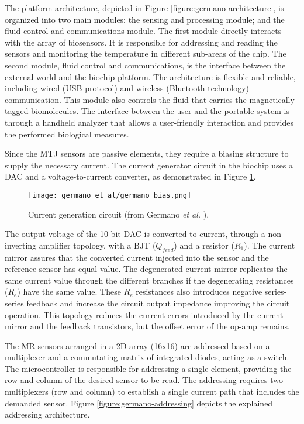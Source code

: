 The platform architecture, depicted in Figure \ref{figure:germano-architecture}, is organized into two main modules: the sensing and processing module; and the fluid control and communications module. The first module directly interacts with the array of biosensors. It is responsible for addressing and reading the sensors and monitoring the temperature in different sub-areas of the chip. The second module, fluid control and communications, is the interface between the external world and the biochip platform. The architecture is flexible and reliable, including wired (\ac{USB} protocol) and wireless (Bluetooth technology) communication. This module also controls the fluid that carries the magnetically tagged biomolecules. The interface between the user and the portable system is through a handheld analyzer that allows a user-friendly interaction and provides the performed biological measures.

Since the \ac{MTJ} sensors are passive elements, they require a biasing structure to supply the necessary current. The current generator circuit in the biochip uses a \ac{DAC} and a voltage-to-current converter, as demonstrated in Figure \ref{figure:germano-bias}.

\begin{figure}[!ht]
    \centering
    \texttt{[image: germano\_et\_al/germano\_bias.png]}
    \caption{Current generation circuit (from Germano \textit{et al.} \cite{Germano2006MICROSYSTEMFB}).}
    \label{figure:germano-bias}
\end{figure}

The output voltage of the 10-bit \ac{DAC} is converted to current, through a non-inverting amplifier topology, with a \ac{BJT} ($Q_{feed}$) and a resistor ($R_1$). The current mirror assures that the converted current injected into the sensor and the reference sensor has equal value. The degenerated current mirror replicates the same current value through the different branches if the degenerating resistances ($R_e$) have the same value. These $R_e$ resistances also introduces negative series-series feedback and increase the circuit output impedance improving the circuit operation. This topology reduces the current errors introduced by the current mirror and the feedback transistors, but the offset error of the op-amp remains.

The \ac{MR} sensors arranged in a \ac{2D} array (16x16) are addressed based on a multiplexer and a commutating matrix of integrated diodes, acting as a switch. The microcontroller is responsible for addressing a single element, providing the row and column of the desired sensor to be read. The addressing requires two multiplexers (row and column) to establish a single current path that includes the demanded sensor. Figure \ref{figure:germano-addressing} depicts the explained addressing architecture.

